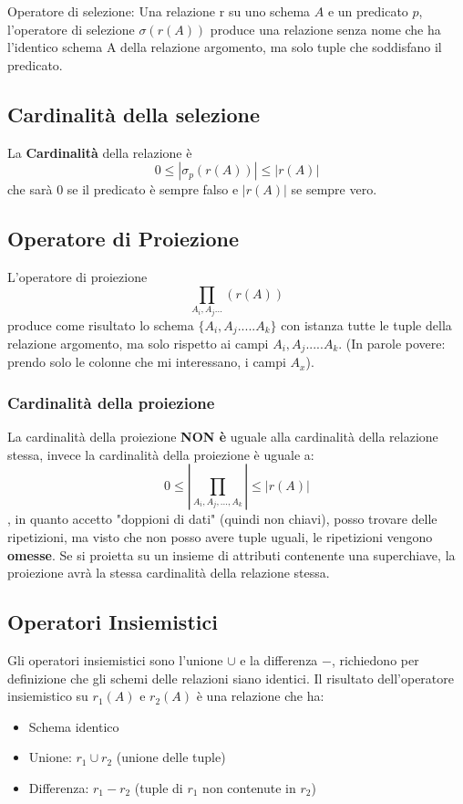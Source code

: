 \documentclass[10pt,twocolumn]{article}
\begin{document}
Operatore di selezione: Una relazione r su uno schema $A$ e un predicato $p$, l'operatore di selezione $\sigma(r(A))$ produce una relazione senza nome che ha l'identico schema A della relazione argomento, ma solo tuple che soddisfano il predicato.
\subsection{Cardinalità della selezione}
La \textbf{Cardinalità} della relazione è \[ 0 \leq | \sigma_p(r(A))| \leq |r(A)|\] che sarà 0 se il predicato è sempre falso e $|r(A)|$ se sempre vero.
\subsection{Operatore di Proiezione}
L'operatore di proiezione \[  \prod_{A_i,A_j...}(r(A)) \] produce come risultato lo schema $\{ A_i,A_j.....A_k \}$ con istanza tutte le tuple della relazione argomento, ma solo rispetto ai campi $A_i,A_j.....A_k$. (In parole povere: prendo solo le colonne che mi interessano, i campi $A_x$).
\subsubsection{Cardinalità della proiezione}
La cardinalità della proiezione \textbf{NON è} uguale alla cardinalità della relazione stessa, invece la cardinalità della proiezione è uguale a: \[
0 \leq |\prod _{A_i, A_j,...,A_k}| \leq |r(A)|
\], in quanto accetto "doppioni di dati" (quindi non chiavi), posso trovare delle ripetizioni, ma visto che non posso avere tuple uguali, le ripetizioni vengono \textbf{omesse}. Se si proietta su un insieme di attributi contenente una superchiave, la proiezione avrà la stessa cardinalità della relazione stessa.
\subsection{Operatori Insiemistici}
Gli operatori insiemistici sono l'unione $\cup$ e la differenza $-$, richiedono per definizione che gli schemi delle relazioni siano identici. Il risultato dell'operatore insiemistico su $r_1(A)$ e $r_2(A)$ è una relazione che ha:
\begin{itemize}
    \item Schema identico
    \item Unione: $r_1 \cup r_2$ (unione delle tuple)
    \item Differenza: $r_1 - r_2$ (tuple di $r_1$ non contenute in $r_2$)
\end{itemize}
\end{document}
